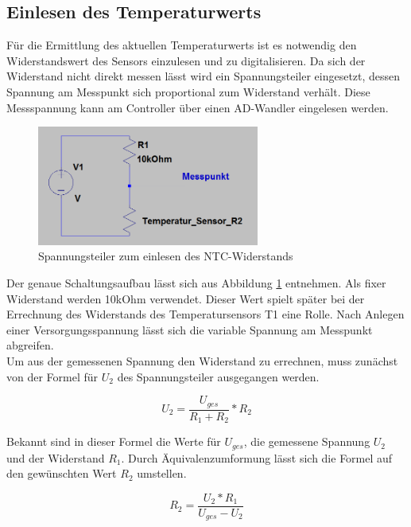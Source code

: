 \subsection{Einlesen des Temperaturwerts}
Für die Ermittlung des aktuellen Temperaturwerts ist es notwendig den Widerstandswert des Sensors einzulesen und zu digitalisieren. Da sich der Widerstand nicht direkt messen lässt wird ein Spannungsteiler eingesetzt, dessen Spannung am Messpunkt sich proportional zum Widerstand verhält. Diese Messspannung kann am Controller über einen AD-Wandler eingelesen werden.

\begin{figure}[ht]
\centering
\includegraphics[width=0.65\textwidth]{sensor/temperature_circuit.PNG}
\caption{Spannungsteiler zum einlesen des NTC-Widerstands}
\label{img:temperature_circuit}
\end{figure}

Der genaue Schaltungsaufbau lässt sich aus Abbildung \ref{img:temperature_circuit} entnehmen. Als fixer Widerstand werden 10kOhm verwendet. Dieser Wert spielt später bei der Errechnung des Widerstands des Temperatursensors T1 eine Rolle. Nach Anlegen einer Versorgungsspannung lässt sich die variable Spannung am Messpunkt abgreifen. \\
\label{lbl:temp_equation}
Um aus der gemessenen Spannung den Widerstand zu errechnen, muss zunächst von der Formel für $U_{2}$ des Spannungsteiler ausgegangen werden.

\begin{equation}
U_{2} = \frac{U_{ges}}{R_{1} + R_{2}} * R_{2}
\end{equation}

Bekannt sind in dieser Formel die Werte für $U_{ges}$, die gemessene Spannung $U_{2}$ und der Widerstand $R_{1}$. Durch Äquivalenzumformung lässt sich die Formel auf den gewünschten Wert $R_{2}$ umstellen.

\begin{equation}
R_{2} = \frac{U_{2} * R_{1}}{U_{ges} - U_{2}}
\end{equation}

